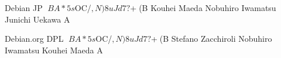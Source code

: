 %

\santaku
{Debian JP $BA*5s$OC/$,N)8uJd$7$?$+(B}
{Kouhei Maeda}
{Nobuhiro Iwamatsu}
{Junichi Uekawa}
{A}
{}


\santaku
{Debian.org DPL $BA*5s$OC/$,N)8uJd$7$?$+(B}
{Stefano Zacchiroli}
{Nobuhiro Iwamatsu}
{Kouhei Maeda}
{A}
{}
